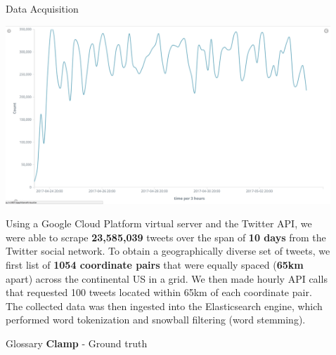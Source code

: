 \documentclass[final]{beamer}
\newlength{\sepwid}
\newlength{\onecolwid}
\newlength{\twocolwid}
\begin{document}
\begin{frame}[t]
\begin{columns}[t]
\begin{column}{\onecolwid}
\begin{block}{Data Acquisition}
\begin{center}\includegraphics[width=0.9\linewidth]{dacq} \end{center}


 Using a Google Cloud Platform virtual server and the Twitter API, we were able to scrape \textbf{23,585,039} tweets over the span of \textbf{10 days} from the Twitter social network. To obtain a geographically diverse set of tweets, we first list of \textbf{1054 coordinate pairs} that were equally spaced (\textbf{65km} apart) across the continental US in a grid. We then made hourly API calls that requested 100 tweets located within 65km of each coordinate pair. The collected data was then ingested into the Elasticsearch engine, which performed word tokenization and snowball filtering (word stemming). 


\end{block}

\begin{alertblock}{Glossary}
\textbf{Clamp} - Ground truth
\end{alertblock}
\end{column} %

\begin{column}{\sepwid}\end{column} %

\begin{column}{\twocolwid} %



\end{column}
\end{columns}
\end{frame}
\end{document}
